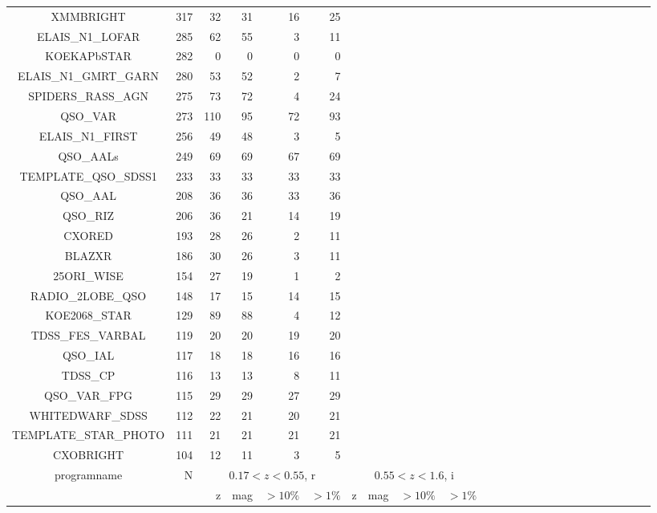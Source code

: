 \documentclass[onecolumn]{aa}
\begin{document}
\begin{center}
\begin{longtable}{c r rrrr rrrr rrrrr rrrrr rrrrr}
XMMBRIGHT 		& 317    & 32    & 31    & 16 & 25 		\\
ELAIS\_N1\_LOFAR 	& 285    & 62    & 55    & 3 & 11 		\\
KOEKAPbSTAR 		& 282    & 0     & 0     & 0 & 0 		\\
ELAIS\_N1\_GMRT\_GARN 	& 280    & 53    & 52    & 2 & 7 		\\
SPIDERS\_RASS\_AGN 	& 275    & 73    & 72    & 4 & 24 		\\
QSO\_VAR 		& 273    & 110   & 95    & 72 & 93 		\\
ELAIS\_N1\_FIRST 	& 256    & 49    & 48    & 3 & 5 		\\
QSO\_AALs 		& 249    & 69    & 69    & 67 & 69 		\\
TEMPLATE\_QSO\_SDSS1 	& 233    & 33    & 33    & 33 & 33 		\\
QSO\_AAL 		& 208    & 36    & 36    & 33 & 36 		\\
QSO\_RIZ 		& 206    & 36    & 21    & 14 & 19 		\\
CXORED 			& 193    & 28    & 26    & 2 & 11 		\\
BLAZXR 			& 186    & 30    & 26    & 3 & 11 		\\
25ORI\_WISE 		& 154    & 27    & 19    & 1 & 2 		\\
RADIO\_2LOBE\_QSO 	& 148    & 17    & 15    & 14 & 15 		\\
KOE2068\_STAR 		& 129    & 89    & 88    & 4 & 12 		\\
TDSS\_FES\_VARBAL 	& 119    & 20    & 20    & 19 & 20 		\\
QSO\_IAL 		& 117    & 18    & 18    & 16 & 16 		\\
TDSS\_CP 		& 116    & 13    & 13    & 8 & 11 		\\
QSO\_VAR\_FPG 		& 115    & 29    & 29    & 27 & 29 		\\
WHITEDWARF\_SDSS	& 112    & 22    & 21    & 20 & 21 		\\
TEMPLATE\_STAR\_PHOTO 	& 111    & 21    & 21    & 21 & 21 		\\
CXOBRIGHT 		& 104    & 12    & 11    & 3 & 5 		\\
\hline \hline
programname                            & N                           &  \multicolumn{4}{c}{$0.17<z<0.55$, r}                            &  \multicolumn{4}{c}{$0.55<z<1.6$, i} \\
                               &                               & z                            & mag                            & $>10\%$                            & $>1\%$                            & z                            & mag                            & $>10\%$                            & $>1\%$ \\

\end{longtable}
\end{center}
\end{document}
